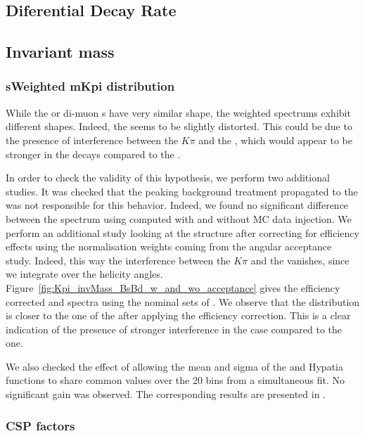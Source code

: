 
\subsection{Diferential Decay Rate}

\subsection{\Kpi Invariant mass}

\subsubsection{sWeighted mKpi distribution}
While the \Bs or \Bd di-muon \sPlot s have very similar shape, the \mkpi weighted spectrums exhibit different shapes. 
Indeed, the \Bs \mkpi \sPlot seems to be slightly distorted. This could be due to the presence of interference between
 the $K\pi$ \swave and the \Kstarz, which would appear to be stronger in the \Bs decays compared to the \Bd. 

In order to check the validity of this hypothesis, we perform two additional studies. 
It was checked that the peaking background treatment propagated to the \sWeights was not responsible for this behavior.
Indeed, we found no significant difference between the \Bs \mkpi spectrum using \sWeights computed with and without MC 
data injection. We perform an additional study looking at the \mkpi structure after correcting for efficiency effects 
using the normalisation weights coming from the angular acceptance study. Indeed, this way the interference between the 
$K\pi$ \swave and the \Kstarz \pwave vanishes, since we integrate over the helicity angles. Figure~\ref{fig:Kpi_invMass_BsBd_w_and_wo_acceptance}
 gives the efficiency corrected \Bs and \Bd \mkpi spectra using the nominal sets of \sWeights. We observe that the \Bs \mkpi distribution
 is closer to the one of the \Bd after applying the efficiency correction. This is a clear indication of the presence of stronger interference 
in the \Bs case compared to the \Bd one. 

We also checked the effect of allowing the mean and sigma of the \Bs and \Bd Hypatia functions to share common values over the 20 bins from
a simultaneous fit. No significant gain was observed. The corresponding results are presented in . 
\subsubsection{CSP factors}


